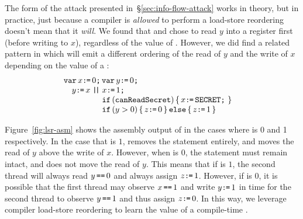 The form of the attack presented in~\S\ref{sec:info-flow-attack} works in
theory, but in practice, just because a compiler is \emph{allowed} to perform a
load-store reordering doesn't mean that it \emph{will}.
We found that {\GCC} and {\CLANG} chose to read $y$ into a
register first (before writing to $x$), regardless of the value of
{\SEC}.
However, we did find a related pattern in which {\GCC} will emit a
different ordering of the read of $y$ and the write of $x$ depending
on the value of a {\SEC}:
\[\begin{array}[t]{@{}l}
  \VAR x\GETS0\SEMI \VAR y\GETS0\SEMI\\\quad
    y\GETS x
  \PAR\begin{array}[t]{@{}l}
    x\GETS 1\SEMI\\
    \IF(\texttt{canReadSecret})\THEN x\GETS\SEC\SEMI\FI\\
    \IF(y > 0)\THEN z\GETS 0 \ELSE z\GETS 1\FI
\end{array}\end{array}\]

Figure~\ref{fig:lsr-asm} shows the assembly output of {\GCC} in the cases
where {\SEC} is 0 and 1 respectively.
In the case that {\SEC} is $1$, {\GCC} removes the \IF
statement entirely, and moves the read of $y$ above the write of $x$.
However, when {\SEC} is $0$, the \IF statement must remain
intact, and {\GCC} does not move the read of $y$.
This means that if {\SEC} is $1$, the second thread will always
read $y\,\texttt{==}\,0$ and always assign $z\texttt{:}\mkern-1mu\texttt{=}\,1$.
However, if {\SEC} is $0$, it is possible that the first thread
may observe $x\,\texttt{==}\,1$ and write $y\texttt{:}\mkern-1mu\texttt{=}\,1$ in time for the second thread
to observe $y\,\texttt{==}\,1$ and thus assign $z\texttt{:}\mkern-1mu\texttt{=}\,0$.
In this way, we leverage compiler load-store reordering to learn the value of
a compile-time {\SEC}.

